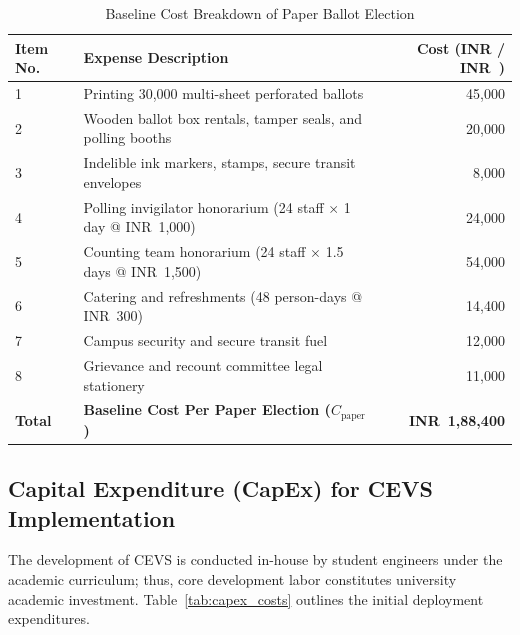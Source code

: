 \documentclass[12pt,a4paper,oneside]{report}
\begin{document}
\begin{table}[H]
    \centering
    \caption{Baseline Cost Breakdown of Paper Ballot Election}
    \label{tab:paper_costs}
    \begin{tabular}{llr}
        \toprule
        \textbf{Item No.} & \textbf{Expense Description} & \textbf{Cost (INR / INR~)} \\
        \midrule
        1 & Printing 30,000 multi-sheet perforated ballots & 45,000 \\
        2 & Wooden ballot box rentals, tamper seals, and polling booths & 20,000 \\
        3 & Indelible ink markers, stamps, secure transit envelopes & 8,000 \\
        4 & Polling invigilator honorarium (24 staff $\times$ 1 day @ INR~1,000) & 24,000 \\
        5 & Counting team honorarium (24 staff $\times$ 1.5 days @ INR~1,500) & 54,000 \\
        6 & Catering and refreshments (48 person-days @ INR~300) & 14,400 \\
        7 & Campus security and secure transit fuel & 12,000 \\
        8 & Grievance and recount committee legal stationery & 11,000 \\
        \midrule
        \textbf{Total} & \textbf{Baseline Cost Per Paper Election ($C_{\text{paper}}$)} & \textbf{INR~1,88,400} \\
        \bottomrule
    \end{tabular}
\end{table}

\subsection{Capital Expenditure (CapEx) for CEVS Implementation}
The development of CEVS is conducted in-house by student engineers under the academic curriculum; thus, core development labor constitutes university academic investment. Table~\ref{tab:capex_costs} outlines the initial deployment expenditures.
\end{document}
